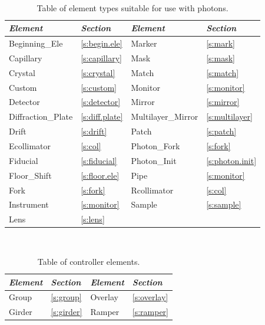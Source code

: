 \begin{table}[ht]
\centering
{\tt
\begin{tabular}{llll} \toprule
  {\it Element}      & {\it Section}         & {\it Element}       & {\it Section}      \\ \midrule
  Beginning_Ele      & \ref{s:begin.ele}     &  Marker             & \ref{s:mark}       \\
  Capillary          & \ref{s:capillary}     &  Mask               & \ref{s:mask}       \\
  Crystal            & \ref{s:crystal}       &  Match              & \ref{s:match}      \\
  Custom             & \ref{s:custom}        &  Monitor            & \ref{s:monitor}    \\ 
  Detector           & \ref{s:detector}      &  Mirror             & \ref{s:mirror}     \\
  Diffraction_Plate  & \ref{s:diff.plate}    &  Multilayer_Mirror  & \ref{s:multilayer} \\
  Drift              & \ref{s:drift}         &  Patch              & \ref{s:patch}      \\
  Ecollimator        & \ref{s:col}           &  Photon_Fork        & \ref{s:fork}       \\
  Fiducial           & \ref{s:fiducial}      &  Photon_Init        & \ref{s:photon.init}\\
  Floor_Shift        & \ref{s:floor.ele}     &  Pipe               & \ref{s:monitor}    \\
  Fork               & \ref{s:fork}          &  Rcollimator        & \ref{s:col}        \\
  Instrument         & \ref{s:monitor}       &  Sample             & \ref{s:sample}     \\
  Lens               & \ref{s:lens}          &                     &                    \\ \bottomrule
\end{tabular}
}
\caption{Table of element types suitable for use with photons.}
\label{t:photon.classes}\center
\end{table}

\begin{table}[ht]
\centering
{\tt
\begin{tabular}{llll} \toprule
  {\it Element}  & {\it Section}     & {\it Element}  & {\it Section}    \\ \midrule
  Group          & \ref{s:group}     &  Overlay       & \ref{s:overlay}  \\
  Girder         & \ref{s:girder}    &  Ramper        & \ref{s:ramper}   \\ \bottomrule
\end{tabular}
}
\caption{Table of controller elements.}
\label{t:control.classes}\center
\end{table}

